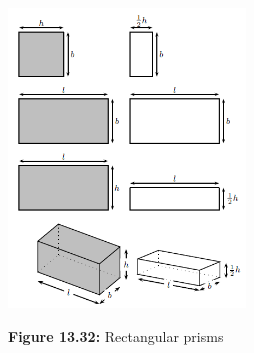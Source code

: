 	\begin{figure}[H] %
    \begin{center}
    \label{m39357*id63644234!!!underscore!!!media}\label{m39357*id63644234!!!underscore!!!printimage}\includegraphics[height=300px]{col11306.imgs/m39357_MG10C14_008.png} %
        
      \vspace{2pt}
    \vspace{\rubberspace}\par \begin{cnxcaption}
	  \small \textbf{Figure 13.32: }Rectangular prisms
	\end{cnxcaption}
      
    \vspace{.1in}
    
    \end{center}

 \end{figure}   

    \addtocounter{footnote}{-0}
    \par 
 
    
      
